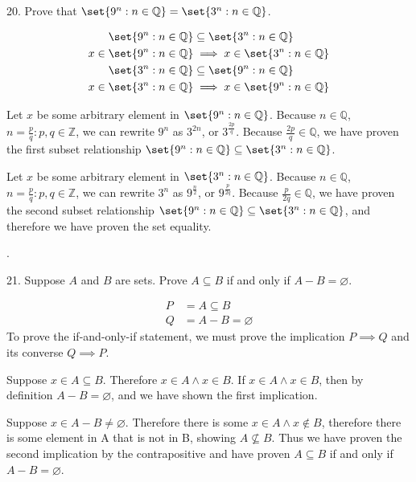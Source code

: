 \documentclass{hippoidC}
\begin{document}
\begin{prooflist}{20. Prove that $\set{9^n: n \in \mathbb{Q}}=\set{3^n: n \in
    \mathbb{Q}}$.}
\item
\begin{align*}
    \set{9^n: n \in \mathbb{Q}} &\subseteq\set{3^n: n \in \mathbb{Q}}\\
    x\in \set{9^n: n \in \mathbb{Q}} &\implies x\in\set{3^n: n \in \mathbb{Q}}\\
    \set{3^n: n \in \mathbb{Q}}
    &\subseteq
    \set{9^n: n \in \mathbb{Q}}\\
    x\in\set{3^n: n \in \mathbb{Q}}
    &\implies
    x\in \set{9^n: n \in \mathbb{Q}}
\end{align*}
\item Let $x$ be some arbitrary element in $\set{9^n: n \in \mathbb{Q}}$.
    Because $n\in\mathbb{Q}$, $n=\frac{p}{q}: p,q\in\mathbb{Z}$,
    we can rewrite $9^n$ as $3^{2n}$, or $3^{\frac{2p}{q}}$. Because
    $\frac{2p}{q} \in \mathbb{Q}$, we have proven the first subset
    relationship $\set{9^n: n \in \mathbb{Q}} \subseteq\set{3^n: n \in
    \mathbb{Q}}$.
\item Let $x$ be some arbitrary element in $\set{3^n: n \in \mathbb{Q}}$.
    Because $n\in\mathbb{Q}$, $n=\frac{p}{q}: p,q\in\mathbb{Z}$,
    we can rewrite $3^n$ as $9^{\frac{n}{2}}$, or $9^{\frac{p}{2q}}$. Because
    $\frac{p}{2q} \in \mathbb{Q}$, we have proven the second subset
    relationship $\set{9^n: n \in \mathbb{Q}} \subseteq\set{3^n: n \in
    \mathbb{Q}}$, and therefore we have proven the set equality.
\end{prooflist}.

\begin{prooflist}{21. Suppose $A$ and $B$ are sets. Prove $A \subseteq B$ if and only if $A-B=\varnothing$.}
\item
    \begin{align*}
        P &= A \subseteq B\\
        Q &= A - B = \varnothing
\end{align*}
To prove the if-and-only-if statement, we must prove the implication $P\implies
Q$ and its converse $Q\implies P$.
\item Suppose $x\in A\subseteq B$. Therefore $x\in A \land x \in B$. If $x\in
    A\land x\in B$, then by definition $A-B=\varnothing$, and we have shown the
    first implication.
\item Suppose $x\in A-B\neq\varnothing$. Therefore there is some $x\in A\land
    x\notin B$, therefore there is some element in A that is not in B, showing
    $A\not\subseteq B$. Thus we have proven the second implication by the
    contrapositive and have proven $A \subseteq B$ if and only if
    $A-B=\varnothing$.
\end{prooflist}
\end{document}
